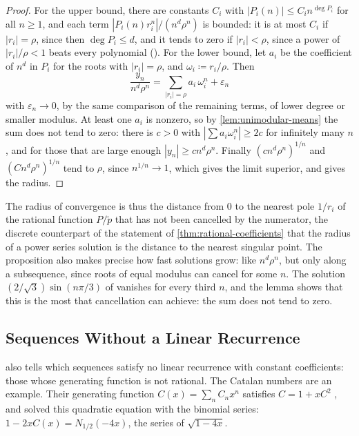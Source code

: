 \begin{proof}
For the upper bound, there are constants $C_i$ with $|P_i(n)|\le C_in^{\deg P_i}$ for all $n\ge1$, and each term $|P_i(n)r_i^n|/(n^d\rho^n)$ is bounded: it is at most $C_i$ if $|r_i|=\rho$, since then $\deg P_i\le d$, and it tends to zero if $|r_i|<\rho$, since a power of $|r_i|/\rho<1$ beats every polynomial (). For the lower bound, let $a_i$ be the coefficient of $n^d$ in $P_i$ for the roots with $|r_i|=\rho$, and $\omega_i\coloneqq r_i/\rho$. Then
\[
\frac{y_n}{n^d\rho^n}=\sum_{|r_i|=\rho}a_i\,\omega_i^n+\varepsilon_n
\]
with $\varepsilon_n\to0$, by the same comparison of the remaining terms, of lower degree or smaller modulus. At least one $a_i$ is nonzero, so by \cref{lem:unimodular-means} the sum does not tend to zero: there is $c>0$ with $|\sum a_i\omega_i^n|\ge2c$ for infinitely many $n$, and for those that are large enough $|y_n|\ge cn^d\rho^n$. Finally $(cn^d\rho^n)^{1/n}$ and $(Cn^d\rho^n)^{1/n}$ tend to $\rho$, since $n^{1/n}\to1$, which gives the limit superior, and  gives the radius.
\end{proof}

The radius of convergence is thus the distance from $0$ to the nearest pole $1/r_i$ of the rational function $P/\tilde p$ that has not been cancelled by the numerator, the discrete counterpart of the statement of \cref{thm:rational-coefficients} that the radius of a power series solution is the distance to the nearest singular point. The proposition also makes precise how fast solutions grow: like $n^d\rho^n$, but only along a subsequence, since roots of equal modulus can cancel for some $n$. The solution $(2/\sqrt3)\sin(n\pi/3)$ of  vanishes for every third $n$, and the lemma shows that this is the most that cancellation can achieve: the sum does not tend to zero.

\subsection{Sequences Without a Linear Recurrence}

 also tells which sequences satisfy no linear recurrence with constant coefficients: those whose generating function is not rational. The Catalan numbers are an example. Their generating function $C(x)=\sum_nC_nx^n$ satisfies $C=1+xC^2$ , and  solved this quadratic equation with the binomial series: $1-2xC(x)=N_{1/2}(-4x)$, the series of $\sqrt{1-4x}$.

